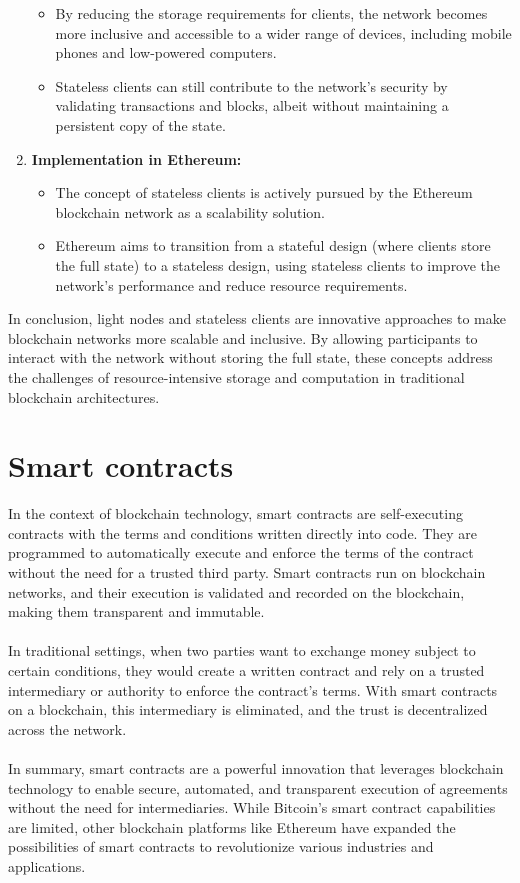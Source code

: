 \begin{enumerate}
\begin{itemize}
		\item By reducing the storage requirements for clients, the network becomes more inclusive and accessible to a wider range of devices, including mobile phones and low-powered computers.
		\item Stateless clients can still contribute to the network's security by validating transactions and blocks, albeit without maintaining a persistent copy of the state.
	\end{itemize}
	\item \textbf{Implementation in Ethereum:}
	\begin{itemize}
		\item The concept of stateless clients is actively pursued by the Ethereum blockchain network as a scalability solution.
		\item Ethereum aims to transition from a stateful design (where clients store the full state) to a stateless design, using stateless clients to improve the network's performance and reduce resource requirements.
	\end{itemize}
\end{enumerate}
In conclusion, light nodes and stateless clients are innovative approaches to make blockchain networks more scalable and inclusive. By allowing participants to interact with the network without storing the full state, these concepts address the challenges of resource-intensive storage and computation in traditional blockchain architectures.

\section{Smart contracts}
In the context of blockchain technology, smart contracts are self-executing contracts with the terms and conditions written directly into code. They are programmed to automatically execute and enforce the terms of the contract without the need for a trusted third party. Smart contracts run on blockchain networks, and their execution is validated and recorded on the blockchain, making them transparent and immutable.\\\\
In traditional settings, when two parties want to exchange money subject to certain conditions, they would create a written contract and rely on a trusted intermediary or authority to enforce the contract's terms. With smart contracts on a blockchain, this intermediary is eliminated, and the trust is decentralized across the network.\\\\
In summary, smart contracts are a powerful innovation that leverages blockchain technology to enable secure, automated, and transparent execution of agreements without the need for intermediaries. While Bitcoin's smart contract capabilities are limited, other blockchain platforms like Ethereum have expanded the possibilities of smart contracts to revolutionize various industries and applications.
